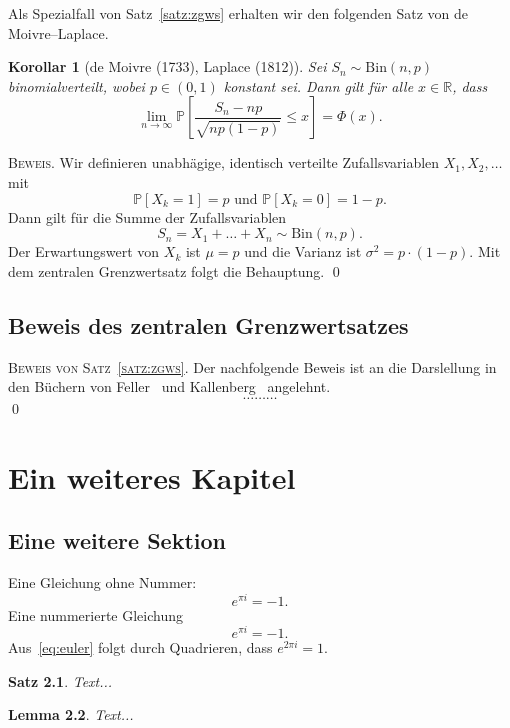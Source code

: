 \documentclass[11pt]{scrreprt}
\renewcommand{\P}{\mathbb {P}} %
\newcommand{\R}{\mathbb {R}}   %
\def\Bin {{\mathrm{Bin}}}  %
\newcommand{\bew}{\textsc{Beweis.} }            %
\newcommand{\bewn}[1]{\textsc{#1.} }
\newcommand{\ebew}{\hfill \qed \vspace*{5mm}}   %
\theoremstyle{plain}
\newtheorem{satz}{Satz}[chapter]
\newtheorem{kor}[satz]{Korollar}
\newtheorem{lem}[satz]{Lemma}
\theoremstyle{remark}
\newtheorem{bem}[satz]{Bemerkung}
\numberwithin{equation}{chapter}
\numberwithin{satz}{chapter}
\numberwithin{section}{chapter}
\begin{document}

Als Spezialfall von Satz~\ref{satz:zgws} erhalten wir den folgenden Satz von de Moivre--Laplace.

\begin{kor}[de Moivre (1733), Laplace (1812)]\label{satz:de_Moivre}
Sei $S_n \sim \Bin(n,p)$ binomialverteilt, wobei $p \in (0,1)$ konstant sei. Dann gilt für alle $x \in \R$, dass
$$
\lim_{n \to \infty} \P\left[ \frac{S_n - np}{\sqrt{np (1-p)}} \leq x \right] = \Phi(x).
$$
\end{kor}

\bew
Wir definieren unabhägige, identisch verteilte Zufallsvariablen $X_1, X_2, \ldots$ mit
$$
 \P[X_k = 1] = p \text{ und } \P[X_k = 0] = 1-p.
$$
Dann gilt für die Summe der Zufallsvariablen
$$
S_n = X_1 + \ldots + X_n \sim \Bin(n,p).
$$
Der Erwartungswert von $X_k$ ist $\mu = p$ und die Varianz ist $\sigma^2 = p \cdot (1-p)$. Mit dem zentralen Grenzwertsatz folgt die Behauptung.
\ebew

\section{Beweis des zentralen Grenzwertsatzes}
\bewn{Beweis von Satz~\ref{satz:zgws}}
Der nachfolgende Beweis ist an die Darslellung in den Büchern von Feller~\cite{Feller_buch} und Kallenberg~\cite{Kallenberg_buch} angelehnt.
$$
\ldots \ldots \ldots
$$
\ebew


\chapter{Ein weiteres Kapitel}
\section{Eine weitere Sektion}
Eine Gleichung ohne Nummer:
$$
e^{\pi i} = -1.
$$
Eine nummerierte Gleichung
\begin{equation}\label{eq:euler}
e^{\pi i} = -1.
\end{equation}
Aus~\eqref{eq:euler} folgt durch Quadrieren, dass $e^{2\pi i} = 1$.

\begin{satz}
Text...
\end{satz}

\begin{lem}
Text...
\end{lem}
\end{document}

